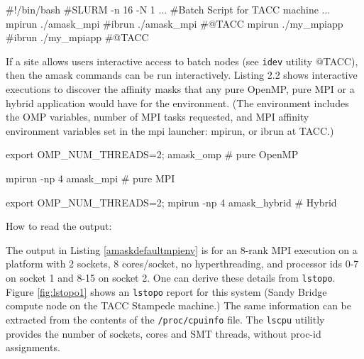 \documentclass[10pt,a4paper]{report}
\begin{document}
\begin{code}[frame=single,breaklines=true,numbers=left,language=C,caption=Listing affinity masks for MPI environment \label{batchamask}]

     #!/bin/bash
     #SLURM  -n 16 -N 1
         ...
     #Batch Script for TACC machine
        ...
      mpirun ./amask_mpi    #ibrun ./amask_mpi #@TACC
      mpirun ./my_mpiapp    #ibrun ./my_mpiapp #@TACC

\end{code}

If a site allows users interactive access to batch nodes (see \verb+idev+ utility @TACC), then
the amask commands can be run interactively. 
Listing 2.2
shows interactive executions to discover the affinity masks
that any pure OpenMP, pure MPI or a hybrid application would have for the environment.
(The environment includes the OMP variables, number of MPI tasks requested, and
MPI affinity environment variables set in the mpi launcher: mpirun, or ibrun at TACC.)

\begin{code}[frame=single,breaklines=true,numbers=left,language=C,caption=Listing OpenMP/MPI and Hybrid masks\label{interactiveamask}]

     export OMP_NUM_THREADS=2; amask_omp   # pure OpenMP
 
     mpirun -np 4 amask_mpi                # pure MPI
 
     export OMP_NUM_THREADS=2; mpirun -np 4 amask_hybrid   # Hybrid

\end{code}
 


How to read the output:

The output in Listing \ref{amaskdefaultmpienv} is for an 8-rank MPI execution on a 
platform with 2 sockets, 8 cores/socket, no hyperthreading, and processor ids 0-7 
on socket 1 and 8-15 on socket 2.  
One can derive these details from \verb+lstopo+.  
Figure \ref{fig:lstopo1} shows an \verb+lstopo+ report for this system (Sandy Bridge compute 
node on the TACC Stampede machine.)
The same information can be extracted from the contents of the \verb+/proc/cpuinfo+ file.
The \verb+lscpu+ utilitly provides the number of sockets, cores and SMT threads, without
proc-id assignments.
\end{document}
